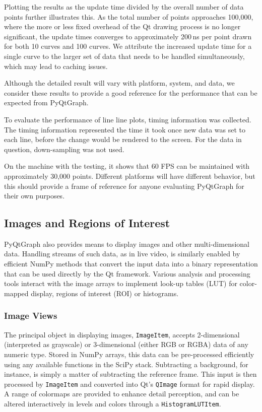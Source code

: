 \documentclass[journal]{vgtc}                %
\begin{document}
Plotting the results as the update time divided by the overall number of data points further illustrates this. As the total number of points approaches 100,000, where the more or less fixed overhead of the Qt drawing process is no longer significant, the update times converges to approximately 200\,ns per point drawn for both 10 curves and 100 curves. We attribute the increased update time for a single curve to the larger set of data that needs to be handled simultaneously, which may lead to caching issues.

Although the detailed result will vary with platform, system, and data, we consider these results to provide a good reference for the performance that can be expected from PyQtGraph.

\makeLineBenchmarkFig

\color{brown}
To evaluate the performance of line line plots, timing information was collected.  The timing information represented the time it took once new data was set to each line, before the change would be rendered to the screen.  For the data in question, down-sampling was not used.

On the machine with the testing, it shows that 60 FPS can be maintained with approximately 30,000 points.  Different platforms will have different behavior, but this should provide a frame of reference for anyone evaluating PyQtGraph for their own purposes. \color{black} 

\subsection{Images and Regions of Interest}

PyQtGraph also provides means to display images and other multi-dimensional data. Handling streams of such data, as in live video, is similarly enabled by efficient NumPy methods that convert the input data into a binary representation that can be used directly by the Qt framework. Various analysis and processing tools interact with the image arrays to implement look-up tables (LUT) for color-mapped display, regions of interest (ROI) or histograms.

\subsubsection{Image Views}

The principal object in displaying images, \texttt{ImageItem}, accepts 2-dimensional (interpreted as grayscale) or 3-dimensional (either RGB or RGBA) data of any numeric type. Stored in NumPy arrays, this data can be pre-processed efficiently using any available functions in the SciPy stack. Subtracting a background, for instance, is simply a matter of subtracting the reference frame. This input is then processed by \texttt{ImageItem} and converted into Qt's \texttt{QImage} format for rapid display. \color{DarkOrchid} A range of colormaps are provided to enhance detail perception, and can be altered interactively in levels and colors through a \texttt{HistogramLUTItem}.
\end{document}
